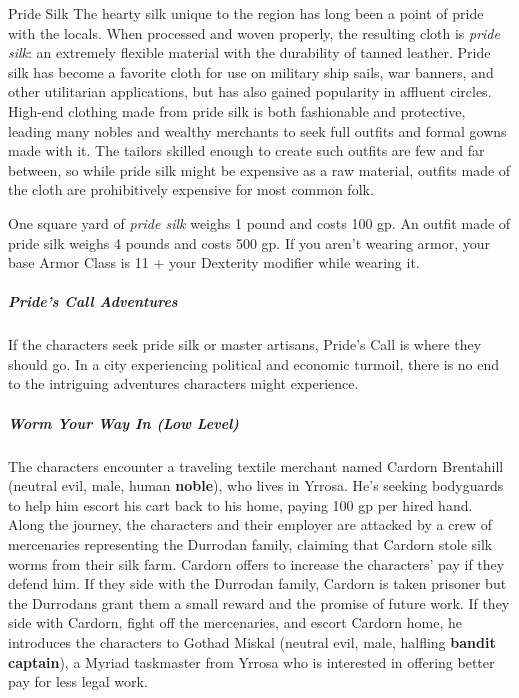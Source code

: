 \documentclass[10pt,a4paper,twoside,bg=print,twocolumn,openany,nodeprecatedcode]{dndbook}
\begin{document}
\begin{DndSidebar}[float=!b]{Pride Silk}
The hearty silk unique to the region has long been a point of pride with the locals. When processed and woven properly, the resulting cloth is \textit{pride silk}: an extremely flexible material with the durability of tanned leather. Pride silk has become a favorite cloth for use on military ship sails, war banners, and other utilitarian applications, but has also gained popularity in affluent circles. High-end clothing made from pride silk is both fashionable and protective, leading many nobles and wealthy merchants to seek full outfits and formal gowns made with it. The tailors skilled enough to create such outfits are few and far between, so while pride silk might be expensive as a raw material, outfits made of the cloth are prohibitively expensive for most common folk.



One square yard of \textit{pride silk} weighs 1 pound and costs 100 gp. An outfit made of pride silk weighs 4 pounds and costs 500 gp. If you aren't wearing armor, your base Armor Class is 11 + your Dexterity modifier while wearing it.



\end{DndSidebar}

\subparagraph{Pride's Call Adventures}
If the characters seek pride silk or master artisans, Pride's Call is where they should go. In a city experiencing political and economic turmoil, there is no end to the intriguing adventures characters might experience.

\subparagraph{Worm Your Way In (Low Level)}
The characters encounter a traveling textile merchant named Cardorn Brentahill (neutral evil, male, human \textbf{noble}), who lives in Yrrosa. He's seeking bodyguards to help him escort his cart back to his home, paying 100 gp per hired hand. Along the journey, the characters and their employer are attacked by a crew of mercenaries representing the Durrodan family, claiming that Cardorn stole silk worms from their silk farm. Cardorn offers to increase the characters' pay if they defend him. If they side with the Durrodan family, Cardorn is taken prisoner but the Durrodans grant them a small reward and the promise of future work. If they side with Cardorn, fight off the mercenaries, and escort Cardorn home, he introduces the characters to Gothad Miskal (neutral evil, male, halfling \textbf{bandit captain}), a Myriad taskmaster from Yrrosa who is interested in offering better pay for less legal work.
\end{document}
